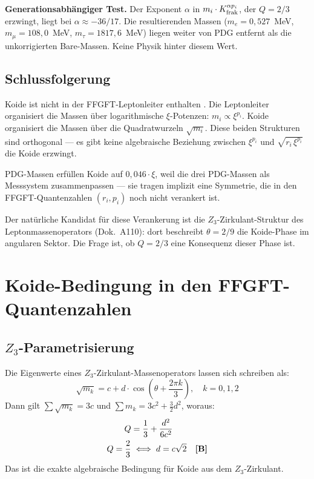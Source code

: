 \textbf{Generationsabhängiger Test.} Der Exponent $\alpha$ in $m_i\cdot K^{\alpha p_i}_{\rm frak}$,
der $Q = 2/3$ erzwingt, liegt bei $\alpha\approx -36/17$. Die resultierenden Massen
($m_e = 0{,}527$~MeV, $m_\mu = 108{,}0$~MeV, $m_\tau = 1817{,}6$~MeV) liegen weiter
von PDG entfernt als die unkorrigierten Bare-Massen. Keine Physik hinter diesem Wert.

\subsection*{Schlussfolgerung}

Koide ist nicht in der FFGFT-Leptonleiter enthalten \SM. Die Leptonleiter organisiert
die Massen über logarithmische $\xi$-Potenzen: $m_i \propto \xi^{p_i}$. Koide
organisiert die Massen über die Quadratwurzeln $\sqrt{m_i}$. Diese beiden Strukturen
sind orthogonal --- es gibt keine algebraische Beziehung zwischen $\xi^{p_i}$ und
$\sqrt{r_i\,\xi^{p_i}}$ die Koide erzwingt.

PDG-Massen erfüllen Koide auf $0{,}046\cdot\xi$, weil die drei PDG-Massen als
Messsystem zusammenpassen --- sie tragen implizit eine Symmetrie, die in den
FFGFT-Quantenzahlen $(r_i, p_i)$ noch nicht verankert ist.

Der natürliche Kandidat für diese Verankerung ist die $Z_3$-Zirkulant-Struktur des
Leptonmassenoperators (Dok.~A110): dort beschreibt $\theta = 2/9$ die Koide-Phase im
angularen Sektor. Die Frage ist, ob $Q = 2/3$ eine Konsequenz dieser Phase ist.

\section{Koide-Bedingung in den FFGFT-Quantenzahlen}

\subsection*{$Z_3$-Parametrisierung}

Die Eigenwerte eines $Z_3$-Zirkulant-Massenoperators lassen sich schreiben als:
\begin{equation}
  \sqrt{m_k} = c + d\cdot\cos\!\left(\theta + \frac{2\pi k}{3}\right), \quad k = 0,1,2
\end{equation}
Dann gilt $\sum\sqrt{m_k} = 3c$ und $\sum m_k = 3c^2 + \tfrac{3}{2}d^2$, woraus:
\begin{align}
  Q &= \frac{1}{3} + \frac{d^2}{6c^2} \\
  Q = \frac{2}{3} &\iff d = c\sqrt{2} \quad\textbf{[B]}
\end{align}
Das ist die exakte algebraische Bedingung für Koide aus dem $Z_3$-Zirkulant.

